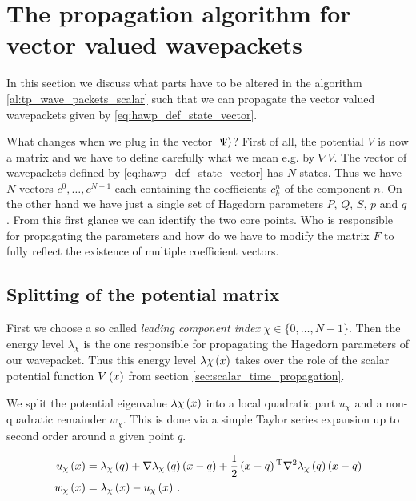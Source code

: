 \section{The propagation algorithm for vector valued wavepackets}

In this section we discuss what parts have to be altered in the algorithm \ref{al:tp_wave_packets_scalar}
such that we can propagate the vector valued wavepackets given by \eqref{eq:hawp_def_state_vector}.

What changes when we plug in the vector $\Ket{\Psi}$? First of all, the potential $V$
is now a matrix and we have to define carefully what we mean e.g. by $\nabla V$.
The vector of wavepackets defined by \eqref{eq:hawp_def_state_vector} has $N$
states. Thus we have $N$ vectors $c^0, \ldots, c^{N-1}$ each containing the coefficients
$c_k^{n}$ of the component $n$. On the other hand we have just a single set of
Hagedorn parameters $P$, $Q$, $S$, $p$ and $q$. From this first glance we can identify
the two core points. Who is responsible for propagating the parameters and how do
we have to modify the matrix $F$ to fully reflect the existence of multiple
coefficient vectors.

\subsection{Splitting of the potential matrix}

First we choose a so called \emph{leading component index} $\chi \in \{0, \ldots, N-1\}$. Then the energy level
$\lambda_\chi$ is the one responsible for propagating the Hagedorn parameters of
our wavepacket. Thus this energy level $\lambda\chi\left( x \right)$ takes over the role of the scalar
potential function $V\left( x \right)$ from section \ref{sec:scalar_time_propagation}.

We split the potential eigenvalue $\lambda\chi\left( x \right)$ into a local quadratic part $u_\chi$
and a non-quadratic remainder $w_\chi$. This is done via a simple Taylor series expansion
up to second order around a given point $q$.

\begin{equation} \label{eq:pot_taylor_split_general}
\begin{split}
  u_\chi\left( x \right) & = \lambda_\chi\left( q \right)
               + \nabla \lambda_\chi \left( q \right) \left( x-q \right)
               + \frac{1}{2} \left( x-q \right){}^{\textnormal{T}} \nabla^2 \lambda_\chi \left( q \right) \left( x-q \right) \\
  w_\chi\left( x \right) & = \lambda_\chi\left( x \right) - u_\chi\left( x \right) \,.
\end{split}
\end{equation}

